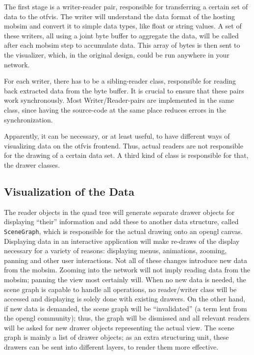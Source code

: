 The first stage is a writer-reader pair, responsible for transferring a certain set of data to the \gls{otfvis}. The writer will understand the data format of the hosting \gls{mobsim} and convert it to simple data types, like float or string values. A set of these writers, all using a joint byte buffer to aggregate the data, will be called after each mobsim step to accumulate data. This array of bytes is then sent to the visualizer, which, in the original design, could be run anywhere in your network.

For each writer, there has to be a sibling-reader class, responsible for reading back extracted data from the byte buffer. 
It is crucial to ensure that these pairs work synchronously. Most Writer/Reader-pairs are implemented in the same class, since having the source-code at the same place reduces errors in the synchronization.

Apparently, it can be necessary, or at least useful, to have different ways of visualizing data on the \gls{otfvis} frontend. Thus, actual readers are not responsible for the drawing of a certain data set. A third kind of class is responsible for that, the drawer classes.

\subsection{Visualization of the Data}
The reader objects in the quad tree will generate separate drawer objects for displaying ``their'' information and add these to another data structure, called \lstinline|SceneGraph|, which is responsible for the actual drawing onto an \gls{opengl} canvas. 
Displaying data in an interactive application will make re-draws of the display necessary for a variety of reasons: displaying menus, animations, zooming, panning and other user interactions. 
Not all of these changes introduce new data from the \gls{mobsim}. 
Zooming into the network will not imply reading data from the \gls{mobsim}; panning the view most certainly will. 
When no new data is needed, the scene graph is capable to handle all operations, no reader/writer class will be accessed and displaying is solely done with existing drawers. 
On the other hand, if new data is demanded, the scene graph will be ``invalidated'' (a term lent from the \gls{opengl} community); thus, the graph will be dismissed and all relevant readers will be asked for new drawer objects representing the actual view. The scene graph is mainly a list of drawer objects; as an extra structuring unit, these drawers can be sent into different layers, to render them more effective.

